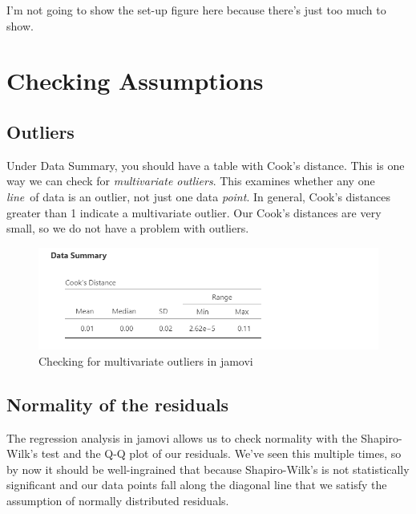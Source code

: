 \documentclass[
]{book}
\begin{document}
I'm not going to show the set-up figure here because there's just too much to show.

\hypertarget{checking-assumptions}{%
\section{Checking Assumptions}\label{checking-assumptions}}

\hypertarget{outliers}{%
\subsection{Outliers}\label{outliers}}

Under Data Summary, you should have a table with Cook's distance. This is one way we can check for \emph{multivariate outliers}. This examines whether any one \emph{line}~of data is an outlier, not just one data \emph{point}. In general, Cook's distances greater than 1 indicate a multivariate outlier. Our Cook's distances are very small, so we do not have a problem with outliers.

\begin{figure}

{\centering \includegraphics[width=1\linewidth]{images/13-regression/regression-cooks} 

}

\caption{Checking for multivariate outliers in jamovi}\label{fig:unnamed-chunk-6}
\end{figure}

\hypertarget{normality-of-the-residuals}{%
\subsection{Normality of the residuals}\label{normality-of-the-residuals}}

The regression analysis in jamovi allows us to check normality with the Shapiro-Wilk's test and the Q-Q plot of our residuals. We've seen this multiple times, so by now it should be well-ingrained that because Shapiro-Wilk's is not statistically significant and our data points fall along the diagonal line that we satisfy the assumption of normally distributed residuals.
\end{document}
